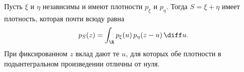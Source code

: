 \begin{theorem}
Пусть $\xi$ и $\eta$ независимы и имеют плотности $p_\xi$ и $p_\eta$.
Тогда $S=\xi+\eta$ имеет плотность, которая почти всюду равна
\[
    p_S(z)=\int_{\R}p_\xi(u)\,p_\eta(z-u)\,\diff u.
\]
При фиксированном $z$ вклад дают те $u$, для которых обе плотности
в подынтегральном произведении отличны от нуля.
\end{theorem}
